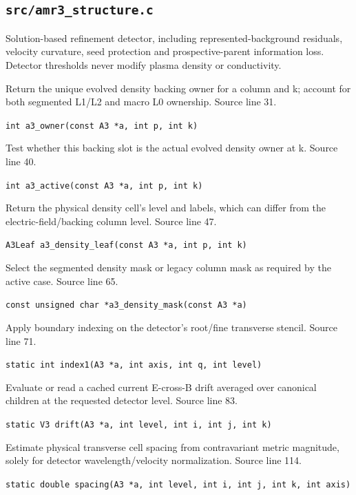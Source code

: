 \subsection{\texttt{src/amr3\_structure.c}}
Solution-based refinement detector, including represented-background residuals, velocity curvature, seed protection and prospective-parent information loss. Detector thresholds never modify plasma density or conductivity.
\begin{description}[style=nextline,leftmargin=0pt,labelindent=0pt,labelwidth=0pt,labelsep=0pt]
\item[\texttt{a3\_owner}] Return the unique evolved density backing owner for a column and k; account for both segmented L1/L2 and macro L0 ownership. Source line 31.\par
{\small\nolinkurl{int a3_owner(const A3 *a, int p, int k)}}
\item[\texttt{a3\_active}] Test whether this backing slot is the actual evolved density owner at k. Source line 40.\par
{\small\nolinkurl{int a3_active(const A3 *a, int p, int k)}}
\item[\texttt{a3\_density\_leaf}] Return the physical density cell's level and labels, which can differ from the electric-field/backing column level. Source line 47.\par
{\small\nolinkurl{A3Leaf a3_density_leaf(const A3 *a, int p, int k)}}
\item[\texttt{a3\_density\_mask}] Select the segmented density mask or legacy column mask as required by the active case. Source line 65.\par
{\small\nolinkurl{const unsigned char *a3_density_mask(const A3 *a)}}
\item[\texttt{index1}] Apply boundary indexing on the detector's root/fine transverse stencil. Source line 71.\par
{\small\nolinkurl{static int index1(A3 *a, int axis, int q, int level)}}
\item[\texttt{drift}] Evaluate or read a cached current E-cross-B drift averaged over canonical children at the requested detector level. Source line 83.\par
{\small\nolinkurl{static V3 drift(A3 *a, int level, int i, int j, int k)}}
\item[\texttt{spacing}] Estimate physical transverse cell spacing from contravariant metric magnitude, solely for detector wavelength/velocity normalization. Source line 114.\par
{\small\nolinkurl{static double spacing(A3 *a, int level, int i, int j, int k, int axis)}}

\end{description}
